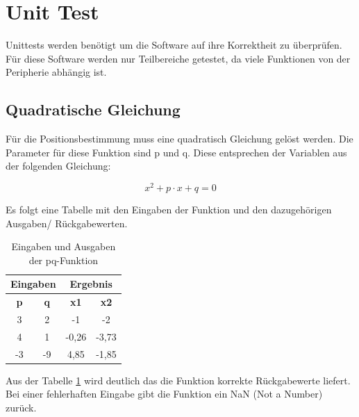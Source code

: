 \newpage
\section{Unit Test}

Unittests werden benötigt um die Software auf ihre Korrektheit zu überprüfen. Für diese Software werden nur Teilbereiche getestet, da viele Funktionen von der Peripherie abhängig ist.

\subsection{Quadratische Gleichung}
Für die Positionsbestimmung muss eine quadratisch Gleichung gelöst werden. Die Parameter für diese Funktion sind \si{p} und \si{q}. Diese entsprechen der Variablen aus der folgenden Gleichung:

\begin{equation}
\label{eq:unit_test_pq_formel}
x^{2} + p \cdot x + q = 0
\end{equation}

Es folgt eine Tabelle mit den Eingaben der Funktion und den dazugehörigen Ausgaben/ Rückgabewerten. 

\begin{table}[H]
\centering
\caption{Eingaben und Ausgaben der pq-Funktion}
\label{table:pq_funktion}
\begin{tabular}{|c|c|c|c|}
\hline
\multicolumn{2}{|c|}{\textbf{Eingaben}} & \multicolumn{2}{c|}{\textbf{Ergebnis}} \\ \hline
\textbf{p}         & \textbf{q}         & \textbf{x1}        & \textbf{x2}       \\ \hline
3                  & 2                  & -1                 & -2                \\ \hline
4                  & 1                  & -0,26                   & -3,73                  \\ \hline
-3                 & -9                 & 4,85                   & -1,85                  \\ \hline
\end{tabular}
\end{table}

Aus der Tabelle \ref{table:pq_funktion} wird deutlich das die Funktion korrekte Rückgabewerte liefert. Bei einer fehlerhaften Eingabe gibt die Funktion ein \si{NaN} (Not a Number) zurück.


